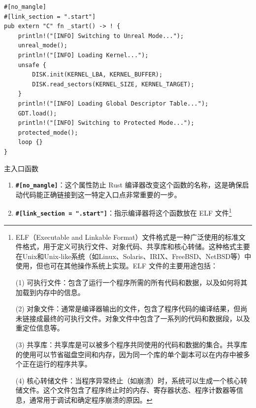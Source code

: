 \begin{listing}[htbp]
    \begin{verbatim}
#[no_mangle]
#[link_section = ".start"]
pub extern "C" fn _start() -> ! {
    println!("[INFO] Switching to Unreal Mode...");
    unreal_mode();
    println!("[INFO] Loading Kernel...");
    unsafe {
        DISK.init(KERNEL_LBA, KERNEL_BUFFER);
        DISK.read_sectors(KERNEL_SIZE, KERNEL_TARGET);
    }
    println!("[INFO] Loading Global Descriptor Table...");
    GDT.load();
    println!("[INFO] Switching to Protected Mode...");
    protected_mode();
    loop {}
}
    \end{verbatim}
    \caption{主入口函数}\label{lst:BootloaderMainFunction}
\end{listing}

\begin{enumerate}
    \item \textbf{\texttt{\#[no\_mangle]}}：这个属性防止 Rust 编译器改变这个函数的名称，这是确保启动代码能正确链接到这一特定入口点非常重要的一步。
    \item \textbf{\texttt{\#[link\_section = ".start"]}}：指示编译器将这个函数放在 ELF 文件\footnote{ELF（Executable and Linkable Format）文件格式是一种广泛使用的标准文件格式，用于定义可执行文件、对象代码、共享库和核心转储。这种格式主要在Unix和Unix-like系统（如Linux、Solaris、IRIX、FreeBSD、NetBSD等）中使用，但也可在其他操作系统上实现。ELF 文件的主要用途包括：

              (1) 可执行文件：包含了运行一个程序所需的所有代码和数据，以及如何将其加载到内存中的信息。

              (2) 对象文件：通常是编译器输出的文件，包含了程序代码的编译结果，但尚未链接成最终的可执行文件。对象文件中包含了一系列的代码和数据段，以及重定位信息等。

              (3) 共享库：共享库是可以被多个程序共同使用的代码和数据的集合。共享库的使用可以节省磁盘空间和内存，因为同一个库的单个副本可以在内存中被多个正在运行的程序共享。

              (4) 核心转储文件：当程序异常终止（如崩溃）时，系统可以生成一个核心转储文件。这个文件包含了程序终止时的内存、寄存器状态、程序计数器等信息，通常用于调试和确定程序崩溃的原因。

}
\end{enumerate}
